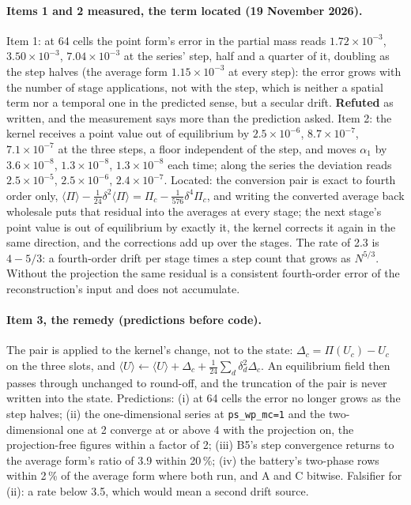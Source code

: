 \documentclass[11pt,a4paper]{article}
\newcommand{\code}[1]{\texttt{\small #1}}
\begin{document}
\paragraph{Items 1 and 2 measured, the term located (19 November 2026).}
Item 1: at 64 cells the point form's error in the partial mass reads
$1.72\times10^{-3}$, $3.50\times10^{-3}$, $7.04\times10^{-3}$ at the
series' step, half and a quarter of it, doubling as the step halves
(the average form $1.15\times10^{-3}$ at every step): the error grows
with the number of stage applications, not with the step, which is
neither a spatial term nor a temporal one in the predicted sense, but a
secular drift.  \textbf{Refuted} as written, and the measurement says
more than the prediction asked.  Item 2: the kernel receives a point
value out of equilibrium by $2.5\times10^{-6}$, $8.7\times10^{-7}$,
$7.1\times10^{-7}$ at the three steps, a floor independent of the step,
and moves $\alpha_1$ by $3.6\times10^{-8}$, $1.3\times10^{-8}$,
$1.3\times10^{-8}$ each time; along the series the deviation reads
$2.5\times10^{-5}$, $2.5\times10^{-6}$, $2.4\times10^{-7}$.  Located:
the conversion pair is exact to fourth order only, $\langle\Pi\rangle
- \tfrac{1}{24}\delta^2\langle\Pi\rangle = \Pi_c - \tfrac{1}{576}
\delta^4\Pi_c$, and writing the converted average back wholesale puts
that residual into the averages at every stage; the next stage's point
value is out of equilibrium by exactly it, the kernel corrects it again
in the same direction, and the corrections add up over the stages.  The
rate of 2.3 is $4 - 5/3$: a fourth-order drift per stage times a step
count that grows as $N^{5/3}$.  Without the projection the same residual
is a consistent fourth-order error of the reconstruction's input and
does not accumulate.

\paragraph{Item 3, the remedy (predictions before code).}  The pair is
applied to the kernel's change, not to the state: $\Delta_c = \Pi(U_c)
- U_c$ on the three slots, and $\langle U\rangle \leftarrow \langle
U\rangle + \Delta_c + \tfrac{1}{24}\sum_d\delta^2_d\Delta_c$.  An
equilibrium field then passes through unchanged to round-off, and the
truncation of the pair is never written into the state.  Predictions:
(i) at 64 cells the error no longer grows as the step halves; (ii) the
one-dimensional series at \code{ps\_wp\_mc=1} and the two-dimensional
one at 2 converge at or above 4 with the projection on, the
projection-free figures within a factor of 2; (iii) B5's step
convergence returns to the average form's ratio of 3.9 within 20\,\%;
(iv) the battery's two-phase rows within 2\,\% of the average form
where both run, and A and C bitwise.  Falsifier for (ii): a rate below
3.5, which would mean a second drift source.
\end{document}
